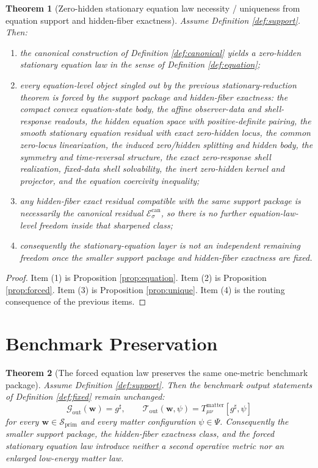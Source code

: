 \documentclass[11pt]{article}
\newcommand{\CompletedMetric}{g^{\sharp}}
\newcommand{\PrimShell}{\mathcal S_{\mathrm{prim}}}
\newcommand{\MetricOut}{\mathscr G_{\mathrm{out}}}
\newcommand{\MatterOut}{\mathscr T_{\mathrm{out}}}
\newcommand{\EqnResidualCan}[1]{\mathcal E_{#1}^{\mathrm{can}}}
\newtheorem{theorem}{Theorem}
\begin{document}
\begin{theorem}[Zero-hidden stationary equation law necessity / uniqueness from equation support and hidden-fiber exactness]
\label{thm:necessity}
Assume Definition \ref{def:support}. Then:
\begin{enumerate}
    \item the canonical construction of Definition \ref{def:canonical} yields a zero-hidden stationary equation law in the sense of Definition \ref{def:equation};
    \item every equation-level object singled out by the previous stationary-reduction theorem is forced by the support package and hidden-fiber exactness: the compact convex equation-state body, the affine observer-data and shell-response readouts, the hidden equation space with positive-definite pairing, the smooth stationary equation residual with exact zero-hidden locus, the common zero-locus linearization, the induced zero/hidden splitting and hidden body, the symmetry and time-reversal structure, the exact zero-response shell realization, fixed-data shell solvability, the inert zero-hidden kernel and projector, and the equation coercivity inequality;
    \item any hidden-fiber exact residual compatible with the same support package is necessarily the canonical residual \(\EqnResidualCan{\sigma}\), so there is no further equation-law-level freedom inside that sharpened class;
    \item consequently the stationary-equation layer is not an independent remaining freedom once the smaller support package and hidden-fiber exactness are fixed.
\end{enumerate}
\end{theorem}

\begin{proof}
Item (1) is Proposition \ref{prop:equation}. Item (2) is Proposition \ref{prop:forced}. Item (3) is Proposition \ref{prop:unique}. Item (4) is the routing consequence of the previous items.
\end{proof}

\section{Benchmark Preservation}

\begin{theorem}[The forced equation law preserves the same one-metric benchmark package]
\label{thm:outputs}
Assume Definition \ref{def:support}. Then the benchmark output statements of Definition \ref{def:fixed} remain unchanged:
\[
\MetricOut(\mathbf w)=\CompletedMetric,
\qquad
\MatterOut(\mathbf w,\psi)
=
T_{\mu\nu}^{\mathrm{matter}}[\CompletedMetric,\psi]
\]
for every \(\mathbf w\in\PrimShell\) and every matter configuration \(\psi\in\Psi\). Consequently the smaller support package, the hidden-fiber exactness class, and the forced stationary equation law introduce neither a second operative metric nor an enlarged low-energy matter law.
\end{theorem}
\end{document}
